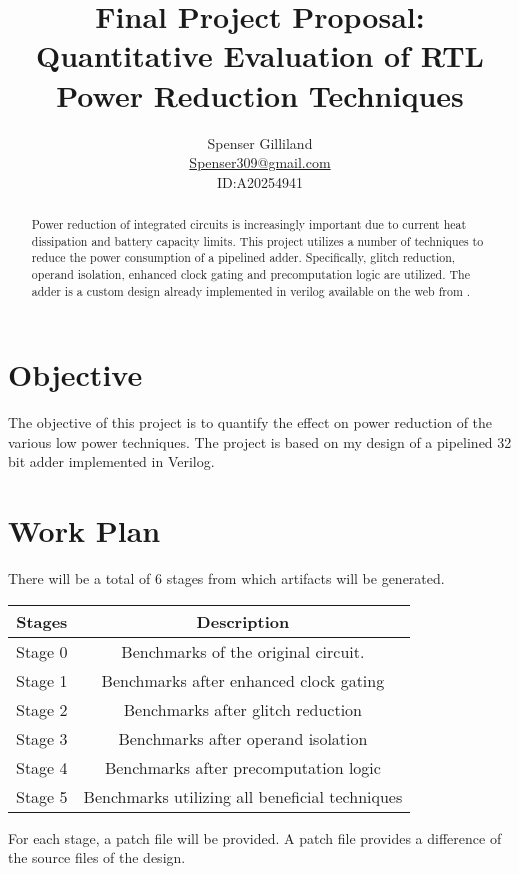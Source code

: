 \documentclass[10pt,letterpaper]{article}
\author{Spenser Gilliland\\
\url{Spenser309@gmail.com}\\
ID:A20254941}
\title{Final Project Proposal: Quantitative Evaluation of RTL Power Reduction Techniques}
\begin{document}
\maketitle
\bigskip

\begin{abstract}
Power reduction of integrated circuits is increasingly important due to current heat dissipation and battery capacity limits.  This project utilizes a number of techniques to reduce the power consumption of a pipelined adder.  Specifically, glitch reduction, operand isolation, enhanced clock gating and precomputation logic are utilized. The adder is a custom design already implemented in verilog available on the web from \cite{code}.
\end{abstract}

\pagebreak

\section{Objective}
The objective of this project is to quantify the effect on power reduction of the various low power techniques.  The project is based on my design of a pipelined 32 bit adder implemented in Verilog.

\section{Work Plan}
There will be a total of 6 stages from which artifacts will be generated.

\begin{center}
\begin{tabular}{|c|c|}
\hline Stages & Description \\
\hline 
\hline Stage 0 & Benchmarks of the original circuit. \\ 
\hline Stage 1 & Benchmarks after enhanced clock gating \\ 
\hline Stage 2 & Benchmarks after glitch reduction \\ 
\hline Stage 3 & Benchmarks after operand isolation \\ 
\hline Stage 4 & Benchmarks after precomputation logic \\ 
\hline Stage 5 & Benchmarks utilizing all beneficial techniques \\ 
\hline 
\end{tabular} 
\end{center}

For each stage, a patch file will be provided.  A patch file provides a difference of the source files of the design.
\end{document}
